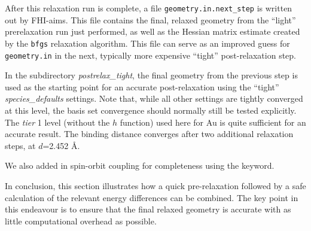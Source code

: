 After this relaxation run is complete, a file \texttt{geometry.in.next\_step} is
written out by FHI-aims. This file contains the final, relaxed geometry from
the ``light'' prerelaxation run just performed, as well as the Hessian matrix
estimate created by the  \texttt{bfgs} relaxation algorithm.
This file can serve as an improved guess for \texttt{geometry.in} in the next, 
typically more expensive ``tight'' post-relaxation step. 

In the subdirectory \emph{postrelax\_tight}, the final geometry from the 
previous step is used as the starting point for an accurate post-relaxation
using the ``tight'' \emph{species\_defaults} settings. Note that,
while all other settings are tightly converged at this level, the basis set
convergence should normally still be tested explicitly. The \emph{tier} 1
level (without the $h$ function) used here for Au is quite sufficient
for an accurate result. The binding 
distance converges after two additional relaxation steps, at $d$=2.452 {\AA}.

We also added in spin-orbit coupling for completeness using the
 keyword.

In conclusion, this section illustrates how a quick pre-relaxation followed 
by a safe calculation of the relevant energy differences can be
combined. The key point in this endeavour is to ensure that the final 
relaxed geometry is accurate with as little computational overhead as
possible. 

